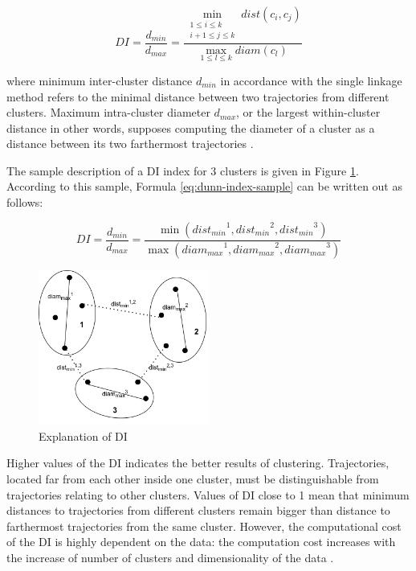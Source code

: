 \begin{equation} \label{eq:dunn-index}
	DI = \frac {d_{min}} {d_{max}} = \frac{\min\limits_{\substack{1 \leq i \leq k \\ i+1 \leq j \leq k}} dist(c_i, c_j)} {\max\limits_{1 \leq l \leq k} diam(c_l)}
\end{equation}

where minimum inter-cluster distance $d_{min}$ in accordance with the single linkage method refers to the minimal distance between two trajectories from different clusters. Maximum intra-cluster diameter $d_{max}$, or the largest within-cluster distance in other words, supposes computing the diameter of a cluster as a distance between its two farthermost trajectories \cite{inproceedings:clust_ind}. 

The sample description of a DI index for 3 clusters is given in Figure \ref{fig:di_sample}. According to this sample, Formula \ref{eq:dunn-index-sample} can be written out as follows:

\begin{equation} \label{eq:dunn-index-sample}
DI = \frac {d_{min}} {d_{max}} = \frac
	{\min ({dist_{min}}^1, {dist_{min}}^2, {dist_{min}}^3)}
	{\max ({diam_{max}}^1, {diam_{max}}^2, {diam_{max}}^3)}
\end{equation}

\begin{figure}[!htb]
	\centering{}
	\includegraphics[width=0.5\textwidth]{images/di-sample.png}
	\caption{Explanation of DI}
	\label{fig:di_sample}
\end{figure}

Higher values of the DI indicates the better results of clustering. Trajectories, located far from each other inside one cluster, must be distinguishable from trajectories relating to other clusters. Values of DI close to 1 mean that minimum distances to trajectories from different clusters remain bigger than distance to farthermost trajectories from the same cluster. However, the computational cost of the DI is highly dependent on the data: the computation cost increases with the increase of number of clusters and dimensionality of the data \cite{online:dunn_cl_valid}.


